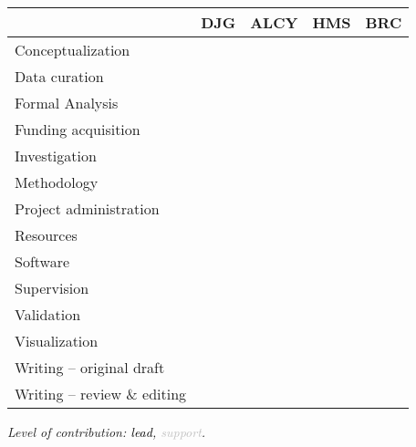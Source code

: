\documentclass[9pt,biorxiv,lineno,onehalfspacing]{lapreprint}
\begin{document}
\begin{refsection}
\begin{table}[h!]
\begin{tabularx}{\textwidth}{|l|X|X|X|X|}
\hline
 & DJG & ALCY & HMS & BRC \\ \hline
Conceptualization  & \cellcolor[HTML]{000000} & \cellcolor[HTML]{000000} & \cellcolor[HTML]{C0C0C0} & \cellcolor[HTML]{000000} \\ \hline
Data curation & \cellcolor[HTML]{000000} &  &  &  \\ \hline
Formal Analysis & \cellcolor[HTML]{000000} & \cellcolor[HTML]{C0C0C0} & \cellcolor[HTML]{000000} &  \\ \hline
Funding acquisition &  &  &  & \cellcolor[HTML]{000000} \\ \hline
Investigation &  &  &  &  \\ \hline
Methodology & \cellcolor[HTML]{000000} & \cellcolor[HTML]{000000} & \cellcolor[HTML]{C0C0C0} & \cellcolor[HTML]{C0C0C0} \\ \hline
Project administration &  &  &  &  \\ \hline
Resources &  &  &  &  \\ \hline
Software &  &  &  &  \\ \hline
Supervision & \cellcolor[HTML]{C0C0C0} &  &  & \cellcolor[HTML]{000000} \\ \hline
Validation &  &  &  &  \\ \hline
Visualization & \cellcolor[HTML]{000000} & \cellcolor[HTML]{000000} & \cellcolor[HTML]{000000} &  \\ \hline
Writing – original draft & \cellcolor[HTML]{000000} &  & \cellcolor[HTML]{C0C0C0} &  \\ \hline
Writing – review \& editing & \cellcolor[HTML]{000000} & \cellcolor[HTML]{C0C0C0} & \cellcolor[HTML]{C0C0C0} & \cellcolor[HTML]{000000} \\ \hline
\end{tabularx}
\end{table}

\noindent
\textit{Level of contribution: \textcolor[HTML]{000000}{lead}, \textcolor[HTML]{C0C0C0}{support}.}

\clearpage
\printbibliography[title=Main Text References]
\end{refsection}

\if@endfloat\clearpage\processdelayedfloats\clearpage\fi 
\end{document}
